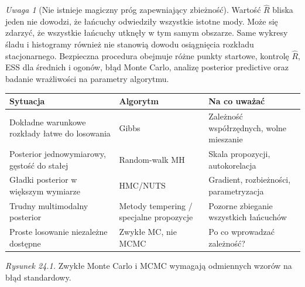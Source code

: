 \documentclass[11pt,a4paper,oneside]{report}
\numberwithin{equation}{chapter}
\theoremstyle{plain}
\theoremstyle{definition}
\theoremstyle{remark}
\newtheorem{uwaga}{Uwaga}[chapter]
\begin{document}
\begin{uwaga}[Nie istnieje magiczny próg zapewniający zbieżność]
Wartość $\widehat R$ bliska jeden nie dowodzi,
że łańcuchy odwiedziły wszystkie istotne mody. Może
się zdarzyć, że wszystkie łańcuchy utknęły w tym samym
obszarze. Same wykresy śladu i histogramy również nie
stanowią dowodu osiągnięcia rozkładu stacjonarnego.
Bezpieczna procedura obejmuje różne punkty startowe,
kontrolę $\widehat R$, ESS dla średnich i ogonów,
błąd Monte Carlo, analizę posterior predictive oraz
badanie wrażliwości na parametry algorytmu.
\end{uwaga}

\begin{center}\small
\begin{tabular}{>{\raggedright\arraybackslash}p{}>{\raggedright\arraybackslash}p{}>{\raggedright\arraybackslash}p{}}
\toprule
\textbf{Sytuacja} & \textbf{Algorytm} & \textbf{Na co uważać}\\
\midrule
Dokładne warunkowe rozkłady łatwe do losowania & Gibbs & Zależność współrzędnych, wolne mieszanie\\
Posterior jednowymiarowy, gęstość do stałej & Random-walk MH & Skala propozycji, autokorelacja\\
Gładki posterior w większym wymiarze & HMC/NUTS & Gradient, rozbieżności, parametryzacja\\
Trudny multimodalny posterior & Metody tempering / specjalne propozycje & Pozorne zbieganie wszystkich łańcuchów\\
Proste losowanie niezależne dostępne & Zwykłe MC, nie MCMC & Po co wprowadzać zależność?\\
\bottomrule
\end{tabular}
\end{center}

\begin{center}

{\small\emph{Rysunek 24.1.} Zwykłe Monte Carlo i MCMC wymagają odmiennych wzorów na błąd standardowy.}
\end{center}
\end{document}
